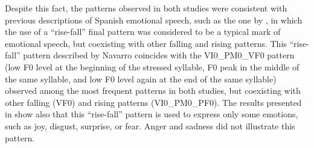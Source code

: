 \documentclass[output=paper]{langsci/langscibook}
\begin{document}
Despite this fact, the patterns observed in both studies were consistent with previous descriptions of Spanish emotional speech, such as the one by \citet{NavarroTomas.1944}, in which the use of a ``rise-fall'' final pattern was considered to be a typical mark of emotional speech, but coexisting with other falling and rising patterns. This ``rise-fall'' pattern described by Navarro coincides with the VI0\_PM0\_VF0 pattern (low F0 level at the beginning of the stressed syllable, F0 peak in the middle of the same syllable, and low F0 level again at the end of the same syllable) observed among the most frequent patterns in both studies, but coexisting with other falling (VF0) and rising patterns (VI0\_PM0\_PF0). The results presented in  show also that this ``rise-fall'' pattern is used to express only some emotions, such as joy, disgust, surprise, or fear. Anger and sadness did not illustrate this pattern.
\end{document}
